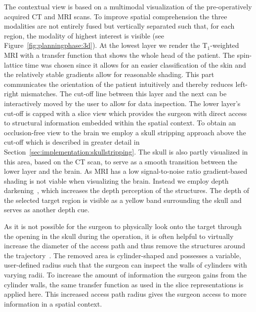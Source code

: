 \documentclass{vgtc}                          %
\begin{document}
The contextual view is based on a multimodal visualization of the pre-operatively acquired CT and MRI scans. To improve spatial comprehension the three modalities are not entirely fused but vertically separated such that, for each region, the modality of highest interest is visible (see Figure~\ref{fig:planningphase:3d}). At the lowest layer we render the T$_1$-weighted MRI with a transfer function that shows the whole head of the patient. The spin-lattice time was chosen since it allows for an easier classification of the skin and the relatively stable gradients allow for reasonable shading. This part communicates the orientation of the patient intuitively and thereby reduces left-right mismatches. The cut-off line between this layer and the next can be interactively moved by the user to allow for data inspection. The lower layer's cut-off is capped with a slice view which provides the surgeon with direct access to structural information embedded within the spatial context. To obtain an occlusion-free view to the brain we employ a skull stripping approach above the cut-off which is described in greater detail in Section~\ref{sec:implementation:skullstripping}. The skull is also partly visualized in this area, based on the CT scan, to serve as a smooth transition between the lower layer and the brain. As MRI has a low signal-to-noise ratio gradient-based shading is not viable when visualizing the brain. Instead we employ depth darkening~\cite{Luft2005}, which increases the depth perception of the structures. The depth of the selected target region is visible as a yellow band surrounding the skull and serves as another depth cue.

As it is not possible for the surgeon to physically look onto the target through the opening in the skull during the operation, it is often helpful to virtually increase the diameter of the access path and thus remove the structures around the trajectory~\cite{Weiskopf2002,Rieder2008}. The removed area is cylinder-shaped and possesses a variable, user-defined radius such that the surgeon can inspect the walls of cylinders with varying radii. To increase the amount of information the surgeon gains from the cylinder walls, the same transfer function as used in the slice representations is applied here. This increased access path radius gives the surgeon access to more information in a spatial context.
\end{document}
